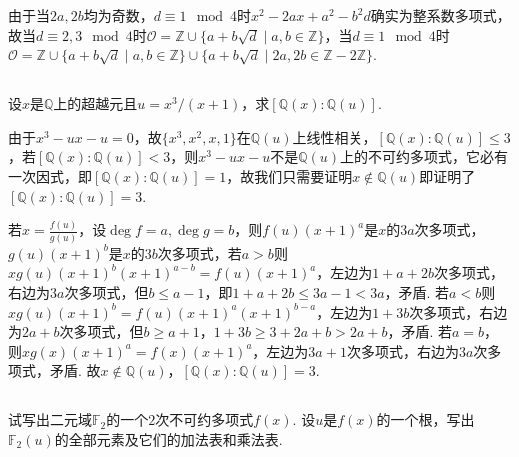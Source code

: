 由于当$2a,2b$均为奇数，$d\equiv 1\mod 4$时$x^2-2ax+a^2-b^2d$确实为整系数多项式，故当$d\equiv 2,3\mod 4$时$\mathcal{O}=\mathbb{Z}\cup\{a+b\sqrt{d}\mid a,b\in\mathbb{Z}\}$，当$d\equiv 1\mod 4$时$\mathcal{O}=\mathbb{Z}\cup\{a+b\sqrt{d}\mid a,b\in\mathbb{Z}\}\cup\{a+b\sqrt{d}\mid 2a,2b\in\mathbb{Z}-2\mathbb{Z}\}$.

\subsection{}
设$x$是$\mathbb{Q}$上的超越元且$u=x^3/(x+1)$，求$[\mathbb{Q}(x):\mathbb{Q}(u)]$.

\jie 由于$x^3-ux-u=0$，故$\{x^3,x^2,x,1\}$在$\mathbb{Q}(u)$上线性相关，$[\mathbb{Q}(x):\mathbb{Q}(u)]\leq 3$，若$[\mathbb{Q}(x):\mathbb{Q}(u)]<3$，则$x^3-ux-u$不是$\mathbb{Q}(u)$上的不可约多项式，它必有一次因式，即$[\mathbb{Q}(x):\mathbb{Q}(u)]=1$，故我们只需要证明$x\notin\mathbb{Q}(u)$即证明了$[\mathbb{Q}(x):\mathbb{Q}(u)]=3$.

若$x=\frac{f(u)}{g(u)}$，设$\deg f=a, \deg g=b$，则$f(u)(x+1)^a$是$x$的$3a$次多项式，$g(u)(x+1)^b$是$x$的$3b$次多项式，若$a>b$则$xg(u)(x+1)^b(x+1)^{a-b}=f(u)(x+1)^a$，左边为$1+a+2b$次多项式，右边为$3a$次多项式，但$b\leq a-1$，即$1+a+2b\leq 3a-1<3a$，矛盾. 若$a<b$则$xg(u)(x+1)^b=f(u)(x+1)^a(x+1)^{b-a}$，左边为$1+3b$次多项式，右边为$2a+b$次多项式，但$b\geq a+1$，$1+3b\geq 3+2a+b>2a+b$，矛盾. 若$a=b$，则$xg(x)(x+1)^a=f(x)(x+1)^a$，左边为$3a+1$次多项式，右边为$3a$次多项式，矛盾. 故$x\notin\mathbb{Q}(u)$，$[\mathbb{Q}(x):\mathbb{Q}(u)]=3$.

\subsection{}
试写出二元域$\mathbb{F}_2$的一个$2$次不可约多项式$f(x)$. 设$u$是$f(x)$的一个根，写出$\mathbb{F}_2(u)$的全部元素及它们的加法表和乘法表.

